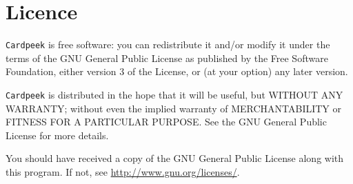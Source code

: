 \documentclass[11pt]{article}
\begin{document}
\section{Licence}

\texttt{Cardpeek} is free software: you can redistribute it and/or modify
it under the terms of the GNU General Public License as published by
the Free Software Foundation, either version 3 of the License, or
(at your option) any later version.

\texttt{Cardpeek} is distributed in the hope that it will be useful,
but WITHOUT ANY WARRANTY; without even the implied warranty of
MERCHANTABILITY or FITNESS FOR A PARTICULAR PURPOSE.  See the
GNU General Public License for more details.

You should have received a copy of the GNU General Public License
along with this program.  If not, see \url{http://www.gnu.org/licenses/}.
\end{document}
